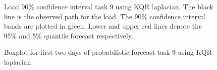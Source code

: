 \begin{figure}[!ht]
    \centering
    \caption[Prediction load track task 9, Laplacian kernel]{Load 90\% confidence interval task 9 using KQR laplacian. The black line is the observed path for the load. The 90\% confidence interval bands are plotted in green. Lower and upper red lines denote the 95\% and 5\% quantile forecast respectively.}
    \label{fig:load_task_9}
\end{figure}


\begin{figure}[!ht]
    \centering
    \caption{Boxplot for first two days of probabilistic forecast task 9 using KQR laplacian}
    \label{fig:load_task_9}
\end{figure}



